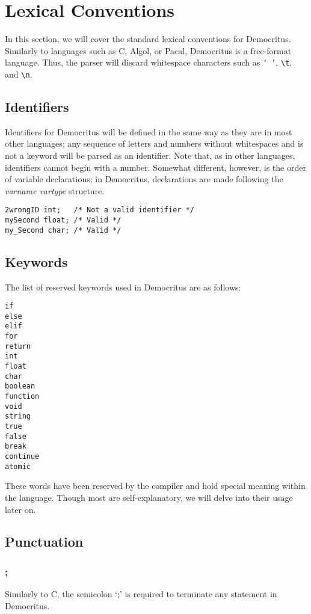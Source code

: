 \chapter{Lexical Conventions}
	In this section, we will cover the standard lexical conventions for Democritus. Similarly to languages such as C, Algol, or Pacal, Democritus is a free-format language. Thus, the parser will discard whitespace characters such as \texttt{` '}, \texttt{\textbackslash t}, and \texttt{\textbackslash n}.
	
	\section{Identifiers}
		Identifiers for Democritus will be defined in the same way as they are in most other languages; any sequence of letters and numbers without whitespaces and is not a keyword will be parsed as an identifier. Note that, as in other languages, identifiers cannot begin with a number. Somewhat different, however, is the order of variable declarations; in Democritus, declarations are made following the \textit{varname vartype} structure. 
		
	\begin{lstlisting}
2wrongID int; 	/* Not a valid identifier */
mySecond float;	/* Valid */
my_Second char; /* Valid */
	\end{lstlisting}
	
	\section{Keywords}
		The list of reserved keywords used in Democritus are as follows:
		\begin{lstlisting}[language={}]
if
else
elif
for
return
int
float
char
boolean
function
void
string
true
false
break
continue
atomic
		\end{lstlisting}
		\noindent These words have been reserved by the compiler and hold special meaning within the language. Though most are self-explanatory, we will delve into their usage later on. 
		
	\section{Punctuation}
		\subsection{;}
			Similarly to C, the semicolon `;' is required to terminate any statement in Democritus. 
